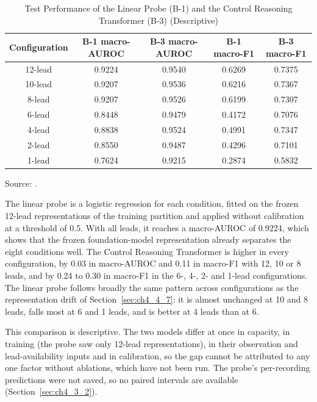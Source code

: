 {
\setlength{\tabcolsep}{2pt}
\renewcommand{\arraystretch}{1.12}
\begin{table}[htbp]
\centering
\footnotesize
{}
\caption[Linear Probe versus Control Reasoning Transformer]{Test Performance of the Linear Probe (B-1) and the Control Reasoning Transformer (B-3) (Descriptive)}\label{tab:ch4_9}
\begin{tabular}{|c|c|c|c|c|}
\hline
\textbf{Configuration} & \textbf{B-1 macro-AUROC} & \textbf{B-3 macro-AUROC} & \textbf{B-1 macro-F1} & \textbf{B-3 macro-F1} \\ \hline
12-lead & 0.9224 & 0.9540 & 0.6269 & 0.7375 \\ \hline
10-lead & 0.9207 & 0.9536 & 0.6216 & 0.7367 \\ \hline
8-lead & 0.9207 & 0.9526 & 0.6199 & 0.7307 \\ \hline
6-lead & 0.8448 & 0.9479 & 0.4172 & 0.7076 \\ \hline
4-lead & 0.8838 & 0.9524 & 0.4991 & 0.7347 \\ \hline
2-lead & 0.8550 & 0.9487 & 0.4296 & 0.7101 \\ \hline
1-lead & 0.7624 & 0.9215 & 0.2874 & 0.5832 \\ \hline
\end{tabular}
\end{table}
}

{\small Source: .}

The linear probe is a logistic regression for each condition, fitted on the frozen 12-lead representations of the training partition and applied without calibration at a threshold of 0.5. With all leads, it reaches a macro-AUROC of 0.9224, which shows that the frozen foundation-model representation already separates the eight conditions well. The Control Reasoning Transformer is higher in every configuration, by 0.03 in macro-AUROC and 0.11 in macro-F1 with 12, 10 or 8 leads, and by 0.24 to 0.30 in macro-F1 in the 6-, 4-, 2- and 1-lead configurations. The linear probe follows broadly the same pattern across configurations as the representation drift of Section~\ref{sec:ch4_4_7}: it is almost unchanged at 10 and 8 leads, falls most at 6 and 1 leads, and is better at 4 leads than at 6.

This comparison is descriptive. The two models differ at once in capacity, in training (the probe saw only 12-lead representations), in their observation and lead-availability inputs and in calibration, so the gap cannot be attributed to any one factor without ablations, which have not been run. The probe's per-recording predictions were not saved, so no paired intervals are available (Section~\ref{sec:ch4_3_2}).

